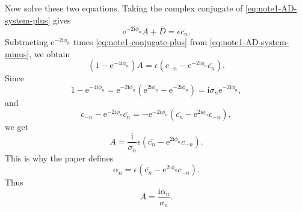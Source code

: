 \documentclass{amsart}
\newcounter{note}
\numberwithin{equation}{hw}
\begin{document}
Now solve these two equations.  Taking the complex conjugate of
\eqref{eq:note1-AD-system-plus} gives
\begin{equation}
\mathrm{e}^{-2\mathrm{i}\phi_n}A+\overline{D}
=
\epsilon\overline{c_n}.
\label{eq:note1-conjugate-plus}
\end{equation}
Subtracting \(\mathrm{e}^{-2\mathrm{i}\phi_n}\) times
\eqref{eq:note1-conjugate-plus} from \eqref{eq:note1-AD-system-minus}, we
obtain
\begin{equation}
\left(1-\mathrm{e}^{-4\mathrm{i}\phi_n}\right)A
=
\epsilon
\left(
c_{-n}
-
\mathrm{e}^{-2\mathrm{i}\phi_n}\overline{c_n}
\right).
\label{eq:note1-solve-A-pre}
\end{equation}
Since
\begin{equation}
1-\mathrm{e}^{-4\mathrm{i}\phi_n}
=
\mathrm{e}^{-2\mathrm{i}\phi_n}
\left(
\mathrm{e}^{2\mathrm{i}\phi_n}
-
\mathrm{e}^{-2\mathrm{i}\phi_n}
\right)
=
\mathrm{i}\sigma_n\mathrm{e}^{-2\mathrm{i}\phi_n},
\label{eq:note1-denominator-A}
\end{equation}
and
\begin{equation}
c_{-n}
-
\mathrm{e}^{-2\mathrm{i}\phi_n}\overline{c_n}
=
-\mathrm{e}^{-2\mathrm{i}\phi_n}
\left(
\overline{c_n}
-
\mathrm{e}^{2\mathrm{i}\phi_n}c_{-n}
\right),
\label{eq:note1-numerator-A}
\end{equation}
we get
\begin{equation}
A
=
\frac{\mathrm{i}}{\sigma_n}
\epsilon
\left(
\overline{c_n}
-
\mathrm{e}^{2\mathrm{i}\phi_n}c_{-n}
\right).
\label{eq:note1-A-alpha-pre}
\end{equation}
This is why the paper defines
\begin{equation}
\alpha_n
=
\epsilon
\left(
\overline{c_n}
-
\mathrm{e}^{2\mathrm{i}\phi_n}c_{-n}
\right).
\label{eq:note1-alpha-definition}
\end{equation}
Thus
\begin{equation}
A=\frac{\mathrm{i}\alpha_n}{\sigma_n}.
\label{eq:note1-A-alpha}
\end{equation}
\end{document}
